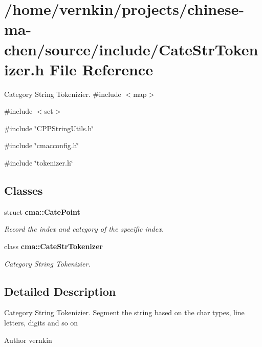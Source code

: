\section{/home/vernkin/projects/chinese-\/ma-\/chen/source/include/CateStrTokenizer.h File Reference}
\label{CateStrTokenizer_8h}


Category String Tokenizier.  
{\ttfamily \#include $<$map$>$}\par
{\ttfamily \#include $<$set$>$}\par
{\ttfamily \#include \char`\"{}CPPStringUtils.h\char`\"{}}\par
{\ttfamily \#include \char`\"{}cmacconfig.h\char`\"{}}\par
{\ttfamily \#include \char`\"{}tokenizer.h\char`\"{}}\par
\subsection*{Classes}
\begin{DoxyCompactItemize}
\item 
struct {\bf cma::CatePoint}
\begin{DoxyCompactList}\small\item\em Record the index and category of the specific index. \item\end{DoxyCompactList}\item 
class {\bf cma::CateStrTokenizer}
\begin{DoxyCompactList}\small\item\em Category String Tokenizier. \item\end{DoxyCompactList}\end{DoxyCompactItemize}


\subsection{Detailed Description}
Category String Tokenizier. Segment the string based on the char types, line letters, digits and so on

\begin{DoxyAuthor}{Author}
vernkin 
\end{DoxyAuthor}
